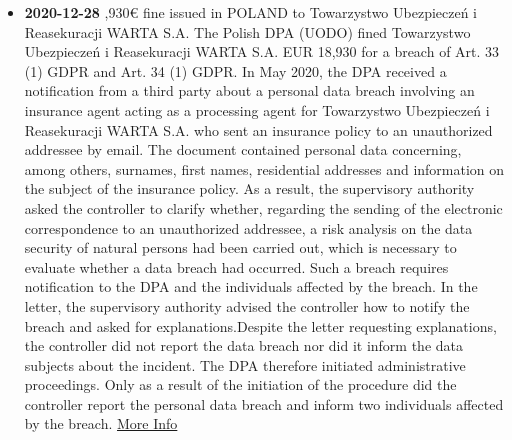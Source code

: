 \documentclass[12pt]{article}
\begin{document}
\begin{multicols}{2}
\begin{itemize}
			\item \textbf{2020-12-28} ,930€ fine issued in POLAND to Towarzystwo Ubezpieczeń i Reasekuracji WARTA S.A.
			\newline
			The Polish DPA (UODO) fined Towarzystwo Ubezpieczeń i Reasekuracji WARTA S.A. EUR 18,930 for a breach of Art. 33 (1) GDPR and Art. 34 (1) GDPR. In May 2020, the DPA received a notification from a third party about a personal data breach involving an insurance agent acting as a processing agent for Towarzystwo Ubezpieczeń i Reasekuracji WARTA S.A. who sent an insurance policy to an unauthorized addressee by email. The document contained personal data concerning, among others, surnames, first names, residential addresses and information on the subject of the insurance policy. As a result, the supervisory authority asked the controller to clarify whether, regarding the sending of the electronic correspondence to an unauthorized addressee, a risk analysis on the data security of natural persons had been carried out, which is necessary to evaluate whether a data breach had occurred. Such a breach requires notification to the DPA and the individuals affected by the breach. In the letter, the supervisory authority advised the controller how to notify the breach and asked for explanations.Despite the letter requesting explanations, the controller did not report the data breach nor did it inform the data subjects about the incident. The DPA therefore initiated administrative proceedings. Only as a result of the initiation of the procedure did the controller report the personal data breach and inform two individuals affected by the breach.
			\newline
			\href{https://uodo.gov.pl/decyzje/DKN.5131.5.2020}{More Info}
		\end{itemize}
	\end{multicols}
\end{document}
